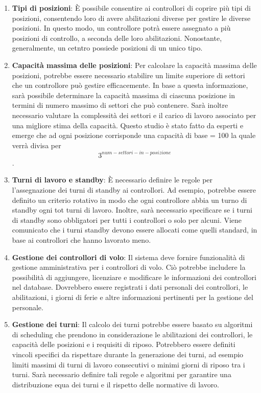 \begin{enumerate}
\item \textbf{Tipi di posizioni}: È possibile consentire ai controllori di coprire più tipi di posizioni, consentendo loro di avere abilitazioni diverse per gestire le diverse posizioni. In questo modo, un controllore potrà essere assegnato a più posizioni di controllo, a seconda delle loro abilitazioni. Nonostante, generalmente, un cetntro possiede posizioni di un unico tipo.

\item \textbf{Capacità massima delle posizioni}: Per calcolare la capacità massima delle posizioni, potrebbe essere necessario stabilire un limite superiore di settori che un controllore può gestire efficacemente. In base a questa informazione, sarà possibile determinare la capacità massima di ciascuna posizione in termini di numero massimo di settori che può contenere. Sarà inoltre necessario valutare la complessità dei settori e il carico di lavoro associato per una migliore stima della capacità. Questo studio è stato fatto da esperti e emerge che ad ogni posizione corrisponde una capacità di base = 100 la quale verrà divisa per \[  3^{num-settori-in-posizione} \].

\item \textbf{Turni di lavoro e standby}: È necessario definire le regole per l'assegnazione dei turni di standby ai controllori. Ad esempio, potrebbe essere definito un criterio rotativo in modo che ogni controllore abbia un turno di standby ogni tot turni di lavoro. Inoltre, sarà necessario specificare se i turni di standby sono obbligatori per tutti i controllori o solo per alcuni. Viene comunicato che i turni standby devono essere allocati come quelli standard, in base ai controllori che hanno lavorato meno.

\item \textbf{Gestione dei controllori di volo}: Il sistema deve fornire funzionalità di gestione amministrativa per i controllori di volo. Ciò potrebbe includere la possibilità di aggiungere, licenziare e modificare le informazioni dei controllori nel database. Dovrebbero essere registrati i dati personali dei controllori, le abilitazioni, i giorni di ferie e altre informazioni pertinenti per la gestione del personale.

\item \textbf{Gestione dei turni}: Il calcolo dei turni potrebbe essere basato su algoritmi di scheduling che prendono in considerazione le abilitazioni dei controllori, le capacità delle posizioni e i requisiti di riposo. Potrebbero essere definiti vincoli specifici da rispettare durante la generazione dei turni, ad esempio limiti massimi di turni di lavoro consecutivi o minimi giorni di riposo tra i turni. Sarà necessario definire tali regole e algoritmi per garantire una distribuzione equa dei turni e il rispetto delle normative di lavoro.


\end{enumerate}
